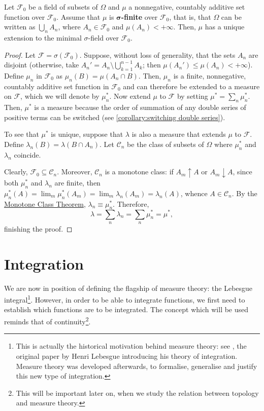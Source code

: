 \begin{thrm}\label{theorem:Caratheodory
Extension} Let \(\mathcal{F}_0\) be a field of subsets of \(\Omega\) and \(\mu\) a
nonnegative, countably additive set function over \(\mathcal{F}_0\). Assume that \(\mu\)
is \(\bm{\sigma}\)\textbf{-finite} over \(\mathcal{F}_0\), that is, that \(\Omega\) can
be written as \(\bigcup_n A_n\), where \(A_n\in\mathcal{F}_0\) and \(\mu(A_n)<+\infty\).
Then, \(\mu\) has a unique extension to the minimal \(\sigma\)-field over
\(\mathcal{F}_0\).
\end{thrm}
\begin{proof} Let \(\mathcal{F}=\sigma(\mathcal{F}_0)\). Suppose, without loss of generality, that
the sets \(A_n\) are disjoint (otherwise, take
\(A_n'=A_n\setminus\bigcup_{k=1}^{n-1}A_k\); then
\(\mu(A_n')\leq\mu(A_n)<+\infty\)). Define \(\mu_n\) in \(\mathcal{F}_0\) as
\(\mu_n(B)=\mu(A_n\cap B)\).  Then, \(\mu_n\) is a finite, nonnegative,
countably additive set function in \(\mathcal{F}_0\) and can therefore be extended to a
measure on \(\mathcal{F}\), which we will denote by  \(\mu_n^*\).  Now extend \(\mu\) to
\(\mathcal{F}\) by setting \(\mu^*=\sum_n\mu_n^*\). Then, \(\mu^*\) is a measure because
the order of summation of any double  series of positive terms can be switched
(see \cref{corollary:switching double series}).
	
	To see that \(\mu^*\) is unique, suppose that \(\lambda\) is also a measure
that extends \(\mu\) to \(\mathcal{F}\). Define  \(\lambda_n(B)=\lambda(B\cap A_n)\). Let
\(\mathcal{C}_n\) be the class of subsets of \(\Omega\) where \(\mu^*_n\) and
\(\lambda_n\) coincide.
	
	Clearly, \(\mathcal{F}_0\subseteq\mathcal{C}_n\). Moreover, \(\mathcal{C}_n\) is a monotone class: if
\(A_m\uparrow A\) or \(A_m\downarrow A\), since  both \(\mu^*_n\) and
\(\lambda_n\) are finite, then
\(\mu^*_n(A)=\lim_m\mu_{n}^*(A_m)=\lim_m\lambda_n(A_m)=\lambda_{n}(A)\), whence
\(A\in\mathcal{C}_n\). By the \hyperref[theorem:Monotone Class]{Monotone Class Theorem},
\(\lambda_n\equiv\mu^*_n\). Therefore,
	\[
			\lambda=\sum_n\lambda_n=\sum_n\mu^*_n=\mu^*
	,\]
finishing the proof.
\end{proof} 
\section{Integration}

We are now in position of defining the
flagship of measure theory: the Lebesgue integral\footnote{This is actually the
historical motivation behind measure theory: see \cite{lebesgue1901}, the
original paper by Henri Lebesgue introducing his theory of integration. Measure
theory was developed afterwards, to formalise, generalise and justify this new type of
integration.}. However, in order to be able to integrate functions, we first
need to establish which functions are to be integrated. The concept which will be used reminds that of continuity\footnote{This will be important later on, when we study the relation between topology and measure theory.}.

